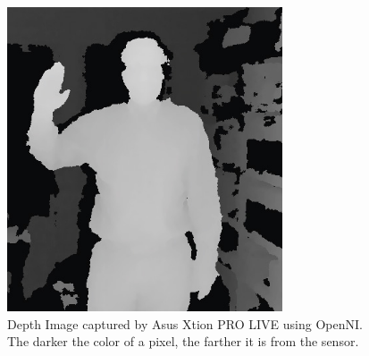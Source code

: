 \begin{figure}
	\centering 
	\includegraphics[height=9cm]{figures/content/xtion-depth.jpg} 	
	\caption{Depth Image captured by Asus Xtion PRO LIVE using OpenNI. The darker the color of a pixel, the farther it is from the sensor. \cite{9} } \label{fg:xtion:depth} 
\end{figure}
